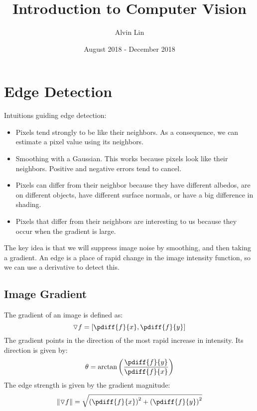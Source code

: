 \documentclass{math}
\title{Introduction to Computer Vision}
\author{Alvin Lin}
\date{August 2018 - December 2018}
\begin{document}
\maketitle

\section*{Edge Detection}
Intuitions guiding edge detection:
\begin{itemize}
  \item Pixels tend strongly to be like their neighbors. As a consequence, we
    can estimate a pixel value using its neighbors.
  \item Smoothing with a Gaussian. This works because pixels look like their
    neighbors. Positive and negative errors tend to cancel.
  \item Pixels can differ from their neighbor because they have different
    albedos, are on different objects, have different surface normals, or have
    a big difference in shading.
  \item Pixels that differ from their neighbors are interesting to us because
    they occur when the gradient is large.
\end{itemize}
The key idea is that we will suppress image noise by smoothing, and then taking
a gradient. An edge is a place of rapid change in the image intensity function,
so we can use a derivative to detect this.

\subsection*{Image Gradient}
The gradient of an image is defined as:
\[ \triangledown{f} = \left[\pdiff{f}{x},\pdiff{f}{y}\right] \]
The gradient points in the direction of the most rapid increase in intensity.
Its direction is given by:
\[ \theta = \arctan\left(\frac{\pdiff{f}{y}}{\pdiff{f}{x}}\right) \]
The edge strength is given by the gradient magnitude:
\[ \|\triangledown{f}\| = \sqrt{\left(\pdiff{f}{x}\right)^2+
  \left(\pdiff{f}{y}\right)^2} \]
\end{document}
